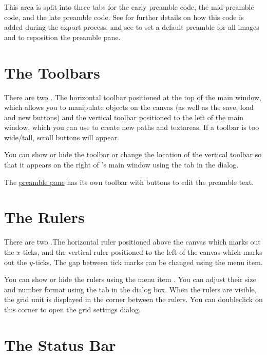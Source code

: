 This area is split into three tabs for the early preamble code,
the mid-preamble code, and the late preamble code.
See  for further details on how this
code is added during the export process, and
see  to set a default preamble
for all images and to reposition the preamble pane.

\section{The Toolbars}\label{sec:thetoolbars}

There are two .  The horizontal toolbar positioned at
the top of the main window, which allows you to manipulate
\glspl{object} on the \gls{canvas} (as well as the save, load and
new buttons) and the vertical toolbar positioned to the left of the
main window, which you can use to create new \glspl{path} and
\glspl{textarea}. If a toolbar is too wide\slash tall, scroll buttons will
appear.

You can show or hide the \gls{toolbar} or change the location of
the vertical toolbar so that it appears on the right of \FlowframTk's
main window using the  tab in the
 dialog.

The \hyperref[sec:thepreamblepane]{preamble pane} has its own
toolbar with buttons to edit the preamble text.


\section{The Rulers}\label{sec:therulers}

There are two .The horizontal ruler
positioned above the \gls{canvas} which marks out the $x$-ticks, and
the vertical ruler positioned to the left of the \gls*{canvas} which
marks out the $y$-ticks. The gap between tick marks can be changed
using the  menu item.

You can show or hide the \glspl*{ruler} using the menu item
.  You can adjust their size and number format
using the  tab in the 
dialog box. When the rulers are visible, the grid unit is displayed
in the corner between the rulers. You can \gls{doubleclick} on this
corner to open the grid settings dialog.

\section{The Status Bar}\label{sec:thestatusbar}

